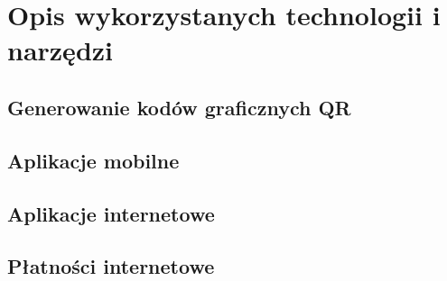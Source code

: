 \section{Opis wykorzystanych technologii i narzędzi}
\subsection{Generowanie kodów graficznych QR}
\subsection{Aplikacje mobilne}
\subsection{Aplikacje internetowe}
\subsection{Płatności internetowe}

